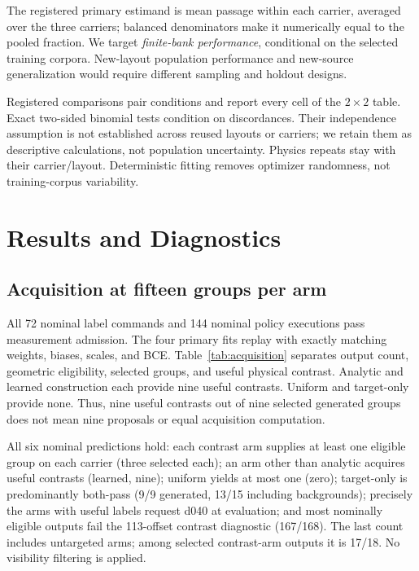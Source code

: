 \documentclass[letterpaper,10pt,conference]{ieeeconf}
\begin{document}
The registered primary estimand is mean passage within each carrier, averaged
over the three carriers; balanced denominators make it numerically equal to
the pooled fraction. We target \emph{finite-bank performance}, conditional on
the selected training corpora. New-layout population performance and new-source
generalization would require different sampling and holdout designs.

Registered comparisons pair conditions and report every cell of the $2\times2$
table. Exact two-sided binomial tests condition on discordances. Their
independence assumption is not established across reused layouts or carriers;
we retain them as descriptive calculations, not population uncertainty.
Physics repeats stay with their carrier/layout. Deterministic fitting removes
optimizer randomness, not training-corpus variability.

\section{Results and Diagnostics}
\subsection{Acquisition at fifteen groups per arm}
\begin{table}[t]
\centering\small
\caption{Nominal acquisition and fitted-label composition. Each arm proposes
48 outputs (16 per carrier), selects nine generated groups, and reuses six
background groups. Eligibility is geometric; outcome columns are physical
paired labels over all fifteen groups. Every group has two labels.}

\label{tab:acquisition}
\end{table}
All 72 nominal label commands and 144 nominal policy executions pass measurement
admission. The four primary fits replay with exactly matching weights, biases,
scales, and BCE. Table~\ref{tab:acquisition} separates output count, geometric
eligibility, selected groups, and useful physical contrast. Analytic and learned
construction each provide nine useful contrasts. Uniform and target-only
provide none. Thus, nine useful contrasts out of nine selected generated
groups does not mean nine proposals or equal acquisition computation.

All six nominal predictions hold: each contrast arm supplies at least one
eligible group on each carrier (three selected each); an arm other than analytic
acquires useful contrasts (learned, nine); uniform yields at most one (zero);
target-only is predominantly both-pass (9/9 generated, 13/15 including
backgrounds); precisely the arms with useful labels request d040 at evaluation;
and most nominally eligible outputs fail the 113-offset contrast diagnostic
(167/168). The last count includes untargeted arms; among selected contrast-arm
outputs it is 17/18. No visibility filtering is applied.
\end{document}
